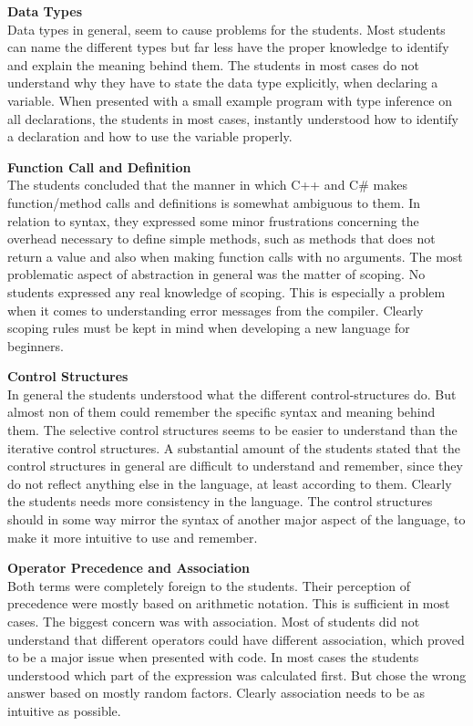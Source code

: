 \textbf{Data Types}\\
Data types in general, seem to cause problems for the students. 
Most students can name the different types but far less have the proper knowledge to identify and explain the meaning behind them. 
The students in most cases do not understand why they have to state the data type explicitly, when declaring a variable. 
When presented with a small example program with type inference on all declarations, the students in most cases, instantly understood how to identify a declaration and how to use the variable properly.

\textbf{Function Call and Definition}\\
The students concluded that the manner in which C++ and C{\#} makes function/method calls and definitions is somewhat ambiguous to them. 
In relation to syntax, they expressed some minor frustrations concerning the overhead necessary to define simple methods, such as methods that does not return a value and also when making function calls with no arguments. 
The most problematic aspect of abstraction in general was the matter of scoping. 
No students expressed any real knowledge of scoping. 
This is especially a problem when it comes to understanding error messages from the compiler. 
Clearly scoping rules must be kept in mind when developing a new language for beginners.

\textbf{Control Structures}\\
In general the students understood what the different control-structures do. 
But almost non of them could remember the specific syntax and meaning behind them. 
The selective control structures seems to be easier to understand than the iterative control structures. 
A substantial amount of the students stated that the control structures in general are difficult to understand and remember, since they do not reflect anything else in the language, at least according to them.
Clearly the students needs more consistency in the language. 
The control structures should in some way mirror the syntax of another major aspect of the language, to make it more intuitive to use and remember.

\textbf{Operator Precedence and Association}\\
Both terms were completely foreign to the students. Their perception of precedence were mostly based on arithmetic notation. 
This is sufficient in most cases. The biggest concern was with association. 
Most of students did not understand that different operators could have different association, which proved to be a major issue when presented with code. 
In most cases the students understood which part of the expression was calculated first. 
But chose the wrong answer based on mostly random factors. 
Clearly association needs to be as intuitive as possible.

